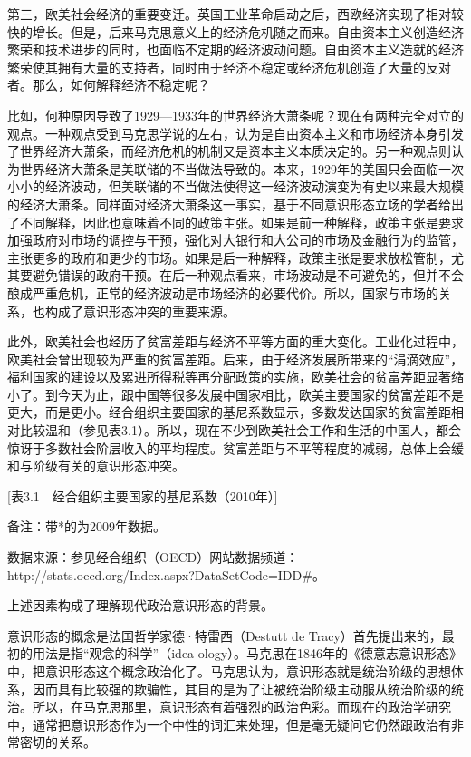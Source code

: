 第三，欧美社会经济的重要变迁。英国工业革命启动之后，西欧经济实现了相对较快的增长。但是，后来马克思意义上的经济危机随之而来。自由资本主义创造经济繁荣和技术进步的同时，也面临不定期的经济波动问题。自由资本主义造就的经济繁荣使其拥有大量的支持者，同时由于经济不稳定或经济危机创造了大量的反对者。那么，如何解释经济不稳定呢？

比如，何种原因导致了1929—1933年的世界经济大萧条呢？现在有两种完全对立的观点。一种观点受到马克思学说的左右，认为是自由资本主义和市场经济本身引发了世界经济大萧条，而经济危机的机制又是资本主义本质决定的。另一种观点则认为世界经济大萧条是美联储的不当做法导致的。本来，1929年的美国只会面临一次小小的经济波动，但美联储的不当做法使得这一经济波动演变为有史以来最大规模的经济大萧条。同样面对经济大萧条这一事实，基于不同意识形态立场的学者给出了不同解释，因此也意味着不同的政策主张。如果是前一种解释，政策主张是要求加强政府对市场的调控与干预，强化对大银行和大公司的市场及金融行为的监管，主张更多的政府和更少的市场。如果是后一种解释，政策主张是要求放松管制，尤其要避免错误的政府干预。在后一种观点看来，市场波动是不可避免的，但并不会酿成严重危机，正常的经济波动是市场经济的必要代价。所以，国家与市场的关系，也构成了意识形态冲突的重要来源。

此外，欧美社会也经历了贫富差距与经济不平等方面的重大变化。工业化过程中，欧美社会曾出现较为严重的贫富差距。后来，由于经济发展所带来的“涓滴效应”，福利国家的建设以及累进所得税等再分配政策的实施，欧美社会的贫富差距显著缩小了。到今天为止，跟中国等很多发展中国家相比，欧美主要国家的贫富差距不是更大，而是更小。经合组织主要国家的基尼系数显示，多数发达国家的贫富差距相对比较温和（参见表3.1）。所以，现在不少到欧美社会工作和生活的中国人，都会惊讶于多数社会阶层收入的平均程度。贫富差距与不平等程度的减弱，总体上会缓和与阶级有关的意识形态冲突。

[表3.1　经合组织主要国家的基尼系数（2010年）]

备注：带*的为2009年数据。

数据来源：参见经合组织（OECD）网站数据频道：http://stats.oecd.org/Index.aspx?DataSetCode=IDD#。

上述因素构成了理解现代政治意识形态的背景。

意识形态的概念是法国哲学家德·特雷西（Destutt de Tracy）首先提出来的，最初的用法是指“观念的科学”（idea-ology）。马克思在1846年的《德意志意识形态》中，把意识形态这个概念政治化了。马克思认为，意识形态就是统治阶级的思想体系，因而具有比较强的欺骗性，其目的是为了让被统治阶级主动服从统治阶级的统治。所以，在马克思那里，意识形态有着强烈的政治色彩。而现在的政治学研究中，通常把意识形态作为一个中性的词汇来处理，但是毫无疑问它仍然跟政治有非常密切的关系。

